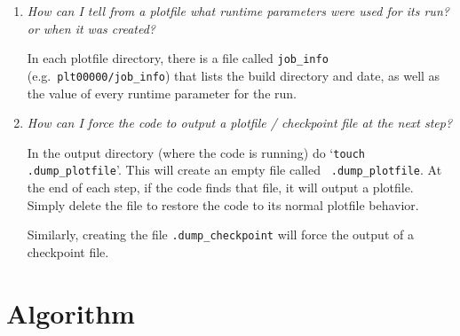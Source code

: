 \begin{enumerate}


\item {\em How can I tell from a plotfile what runtime parameters were
   used for its run? or when it was created?}

   In each plotfile directory, there is a file called {\tt job\_info}
   (e.g.\ {\tt plt00000/job\_info}) that lists the build directory and
   date, as well as the value of every runtime parameter for the run.


\item {\em How can I force the code to output a plotfile / checkpoint
  file at the next step?}

   In the output directory (where the code is running) do `{\tt touch
     .dump\_plotfile}'.  This will create an empty file called {\tt
     .dump\_plotfile}.  At the end of each step, if the code finds
   that file, it will output a plotfile.  Simply delete the file to
   restore the code to its normal plotfile behavior.

   Similarly, creating the file {\tt .dump\_checkpoint} will force the
   output of a checkpoint file.  

\end{enumerate}



\section{Algorithm}

